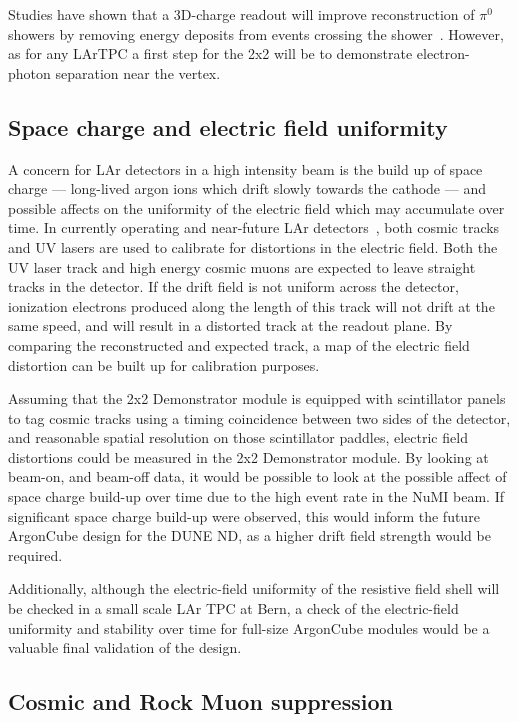 Studies have shown that a 3D-charge readout will improve reconstruction of $\pi^{0}$ showers by removing energy deposits from events crossing the shower~\cite{Damian}. However, as for any LArTPC a first step for the 2x2 will be to demonstrate electron-photon separation near the vertex.    

\subsection{Space charge and electric field uniformity}
\label{sec:efield}
A concern for LAr detectors in a high intensity beam is the build up of space charge --- long-lived argon ions which drift slowly towards the cathode --- and possible affects on the uniformity of the electric field which may accumulate over time. In currently operating and near-future LAr detectors~\cite{Ereditato:2014lra, Antonello:2015lea}, both cosmic tracks and UV lasers are used to calibrate for distortions in the electric field. Both the UV laser track and high energy cosmic muons are expected to leave straight tracks in the detector. If the drift field is not uniform across the detector, ionization electrons produced along the length of this track will not drift at the same speed, and will result in a distorted track at the readout plane. By comparing the reconstructed and expected track, a map of the electric field distortion can be built up for calibration purposes.

Assuming that the 2x2 Demonstrator module is equipped with scintillator panels to tag cosmic tracks using a timing coincidence between two sides of the detector, and reasonable spatial resolution on those scintillator paddles, electric field distortions could be measured in the 2x2 Demonstrator module. By looking at beam-on, and beam-off data, it would be possible to look at the possible affect of space charge build-up over time due to the high event rate in the NuMI beam. If significant space charge build-up were observed, this would inform the future ArgonCube design for the DUNE ND, as a higher drift field strength would be required.

Additionally, although the electric-field uniformity of the resistive field shell will be checked in a small scale LAr TPC at Bern, a check of the electric-field uniformity and stability over time for full-size ArgonCube modules would be a valuable final validation of the design.

\subsection{Cosmic and Rock Muon suppression}
\label{sec:cosmic-suppression}

